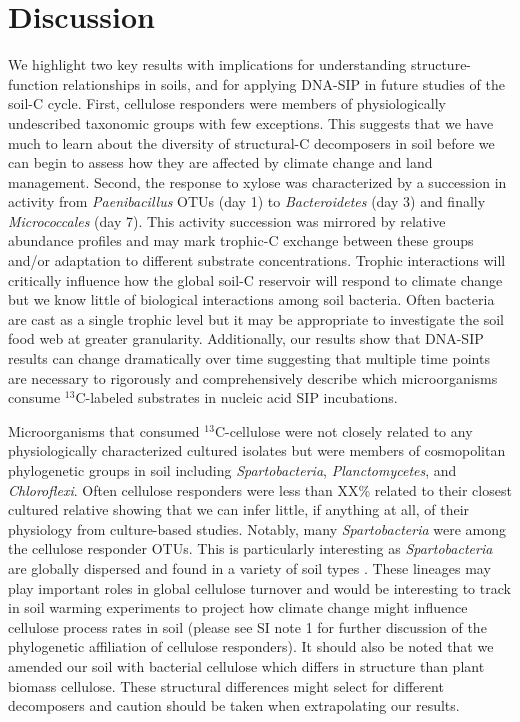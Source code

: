 \section{Discussion} 
We highlight two key results with implications for understanding structure-function
relationships in soils, and for applying DNA-SIP in future studies of the soil-C
cycle. First, cellulose responders were members of physiologically undescribed
taxonomic groups with few exceptions. This suggests that we have much to learn
about the diversity of structural-C decomposers in soil before we can begin to
assess how they are affected by climate change and land management. Second, the
response to xylose was characterized by a succession in activity from
\textit{Paenibacillus} OTUs (day 1) to \textit{Bacteroidetes} (day 3) and finally
\textit{Micrococcales} (day 7). This activity succession was mirrored by relative
abundance profiles and may mark trophic-C exchange between these groups and/or
adaptation to different substrate concentrations. Trophic interactions will
critically influence how the global soil-C reservoir will respond to climate
change \citep{Crowther2015} but we know little of biological interactions among
soil bacteria. Often bacteria are cast as a single trophic level
\citep{Moore1988} but it may be appropriate to investigate the soil food web at
greater granularity.  Additionally, our results show that DNA-SIP results can
change dramatically over time suggesting that multiple time points are
necessary to rigorously and comprehensively describe which microorganisms
consume $^{13}$C-labeled substrates in nucleic acid SIP incubations.

Microorganisms that consumed $^{13}$C-cellulose were not closely related to any
physiologically characterized cultured isolates but were members of
cosmopolitan phylogenetic groups in soil including \textit{Spartobacteria},
\textit{Planctomycetes}, and \textit{Chloroflexi}. Often cellulose responders
were less than XX\% related to their closest cultured relative showing that we
can infer little, if anything at all, of their physiology from culture-based
studies. Notably, many \textit{Spartobacteria} were among the cellulose responder OTUs.
This is particularly interesting as \textit{Spartobacteria} are globally
dispersed and found in a variety of soil types \citep{Bergmann_2011}. These lineages may play
important roles in global cellulose turnover and would be interesting to track
in soil warming experiments to project how climate change might influence
cellulose process rates in soil (please see SI note 1 for further discussion of the
phylogenetic affiliation of cellulose responders). It should also be noted that
we amended our soil with bacterial cellulose which differs in structure than
plant biomass cellulose. These structural differences might select for different 
decomposers and caution should be taken when extrapolating our results.

